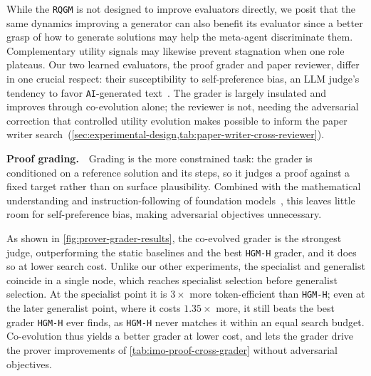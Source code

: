 \documentclass{paper}
\newcommand{\ourmethod}{\texttt{RQGM}\xspace}
\newcommand{\theourmethod}{the \ourmethod}
\newcommand{\AI}{\texttt{AI}}
\newcommand{\hgmh}{\texttt{HGM-H}\xspace}
\begin{document}
While \theourmethod is not designed to improve evaluators directly, we posit that the same dynamics improving a generator can also benefit its evaluator since a better grasp of how to generate solutions may help the meta-agent discriminate them. Complementary utility signals may likewise prevent stagnation when one role plateaus. Our two learned evaluators, the proof grader and paper reviewer, differ in one crucial respect: their susceptibility to self-preference bias, an LLM judge's tendency to favor \AI-generated text~\citep{DBLP:conf/nips/PanicksseryBF24}. The grader is largely insulated and improves through co-evolution alone; the reviewer is not, needing the adversarial correction that controlled utility evolution makes possible to inform the paper writer search~(\cref{sec:experimental-design,tab:paper-writer-cross-reviewer}).


\noindent\textbf{Proof grading.}~~Grading is the more constrained task: the grader is conditioned on a reference solution and its steps, so it judges a proof against a fixed target rather than on surface plausibility. Combined with the mathematical understanding and instruction-following of foundation models~\citep{openai2025imo,openai2025science,zhou2023instruction}, this leaves little room for self-preference bias, making adversarial objectives unnecessary.

As shown in \cref{fig:prover-grader-results}, the co-evolved grader is the strongest judge, outperforming the static baselines and the best \hgmh grader, and it does so at lower search cost. Unlike our other experiments, the specialist and generalist coincide in a single node, which reaches specialist selection before generalist selection. At the specialist point it is $3\times$ more token-efficient than \hgmh; even at the later generalist point, where it costs $1.35\times$ more, it still beats the best grader \hgmh ever finds, as \hgmh never matches it within an equal search budget. Co-evolution thus yields a better grader at lower cost, and lets the grader drive the prover improvements of \cref{tab:imo-proof-cross-grader} without adversarial objectives.
\end{document}
